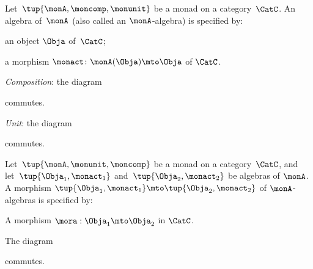 \begin{ctdefinition}
    \label{def:algebramon}
    Let~$\tup{\monA, \moncomp, \monunit}$ be a monad on a category~$\CatC$.
    An algebra of~$\monA$ (also called an $\monA$-algebra) is specified by: \
    
    \constit
    \begin{compactenum}
        \item an object $\Obja$ of~$\CatC$;
        \item a morphism $\monact\colon \monA(\Obja) \mto \Obja$ of $\CatC$.
    \end{compactenum}
    \condit
    \begin{compactenum}
        \item \emph{Composition}: the diagram
        \begin{center}
        \end{center}
        commutes.
        \item \emph{Unit}: the diagram
        \begin{center}
        \end{center}
        commutes.
    \end{compactenum}
\end{ctdefinition}




\begin{ctdefinition}
    \label{def:algebramorphism}
    Let~$\tup{\monA, \monunit, \moncomp}$ be a monad on a category~$\CatC$, and let~$\tup{\Obja_1, \monact_1}$ and~$\tup{\Obja_2, \monact_2}$ be algebras of $\monA$.
    A morphism $\tup{\Obja_1, \monact_1} \mto \tup{\Obja_2, \monact_2}$ of $\monA$-algebras is specified by: \
    
    \constit
    \begin{compactenum}
        \item A morphism $\mora : \Obja_1 \mto \Obja_2$ in $\CatC$.
    \end{compactenum}
    \condit
    \begin{compactenum}
        \item The diagram
        \begin{center}
        \end{center}
        commutes.
    \end{compactenum}
\end{ctdefinition}



